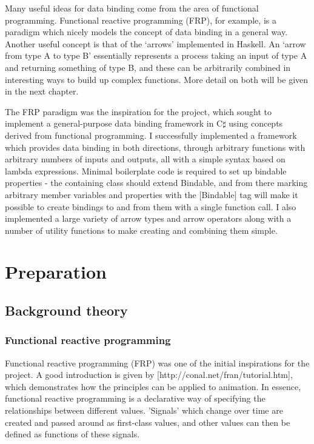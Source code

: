 \documentclass[12pt,twoside,notitlepage]{report}
\begin{document}
Many useful ideas for data binding come from the area of functional programming. Functional reactive programming (FRP), for example, is a paradigm which nicely models the concept of data binding in a general way. Another useful concept is that of the `arrows' implemented in Haskell. An `arrow from type A to type B' essentially represents a process taking an input of type A and returning something of type B, and these can be arbitrarily combined in interesting ways to build up complex functions. More detail on both will be given in the next chapter.

The FRP paradigm was the inspiration for the project, which sought to implement a general-purpose data binding framework in C$\sharp$ using concepts derived from functional programming. I successfully implemented a framework which provides data binding in both directions, through arbitrary functions with arbitrary numbers of inputs and outputs, all with a simple syntax based on lambda expressions. Minimal boilerplate code is required to set up bindable properties - the containing class should extend Bindable, and from there marking arbitrary member variables and properties with the [Bindable] tag will make it possible to create bindings to and from them with a single function call. I also implemented a large variety of arrow types and arrow operators along with a number of utility functions to make creating and combining them simple.

\cleardoublepage



\chapter{Preparation}

\section{Background theory}

\subsection{Functional reactive programming}

Functional reactive programming (FRP) was one of the initial inspirations for the project. A good introduction is given by [http://conal.net/fran/tutorial.htm], which demonstrates how the principles can be applied to animation. In essence, functional reactive programming is a declarative way of specifying the relationships between different values. 'Signals' which change over time are created and passed around as first-class values, and other values can then be defined as functions of these signals.
\end{document}
